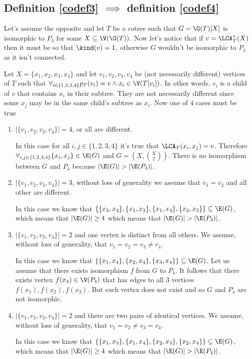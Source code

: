 \subsection{Definition \ref{codef3} $\implies$ definition \ref{codef4}}

Let's assume the opposite and let $T$ be a cotree such that $G = \G(T)[X]$ is isomorphic to $P_4$ for some $X \subseteq \V(\G(T))$. Now let's notice that if $v = \LCA_T^s(X)$ then it must be so that $\kind(v) = 1$, otherwise $G$ wouldn't be isomorphic to $P_4$ as it isn't connected.

Let $X = \{x_1, x_2, x_3, x_4\}$ and let $v_1, v_2, v_3, v_4$ be (not necessarily different) vertices of $T$ such that $\forall_{i \in \{1,2,3,4\}} p_T(v_i) = v \land x_i \in \V(T[v_i])$. In other words, $v_i$ is a child of $v$ that contains $x_i$ in their subtree. They are not necessarily different since some $x_j$ may be in the same child's subtree as $x_i$. Now one of 4 cases must be true
\begin{enumerate}
    \item $|\{v_1, v_2, v_3, v_4\}| = 4$, or all are different.

          In this case for all $i,j \in \{1,2,3,4\}$ it's true that $\LCA_T(x_i, x_j) = v$. Therefore \linebreak $\forall_{i,j \in \{1,2,3,4\}}\{x_i,x_j\}\in \E(G)$ and $G = (X, \binom{X}{2})$. There is no isomorphism between $G$ and $P_4$ because $|\E(G)| > |\E(P_4)|$.

    \item $|\{v_1, v_2, v_3, v_4\}| = 3$, without loss of generality we assume that $v_1 = v_2$ and all other are different.

          In this case we know that $\{\{x_3, x_4\}, \{x_1, x_3\}, \{x_1, x_4\}, \{x_2, x_3\}\} \subseteq \E(G)$, which means that $|\E(G)| \geq 4$ which means that $|\E(G)| > |\E(P_4)|$.


    \item $|\{v_1, v_2, v_3, v_4\}| = 2$ and one vertex is distinct from all others. We assume, without loss of generality, that $v_1 = v_2 = v_3 \neq v_4$.

          In this case we know that $\{\{x_1, x_4\}, \{x_2, x_4\}, \{x_3, x_4\}\} \subseteq \E(G)$. Let us assume that there exists isomorphism $f$ from $G$ to $P_4$. It follows that there exists vertex $f(x_4) \in \V(P_4)$ that has edges to all 3 vertices $f(x_1), f(x_2), f(x_3)$. But such vertex does not exist and so $G$ and $P_4$ are not isomorphic.

    \item $|\{v_1, v_2, v_3, v_4\}| = 2$ and there are two pairs of identical vertices. We assume, without loss of generality, that $v_1 = v_2 \neq v_3 = v_4$.

          In this case we know that $\{\{x_1, x_3\}, \{x_1, x_4\}, \{x_2, x_3\}, \{x_2, x_4\}\} \subseteq \E(G)$, which means that $|\E(G)| \geq 4$ which means that $|\E(G)| > |\E(P_4)|$.
\end{enumerate}

